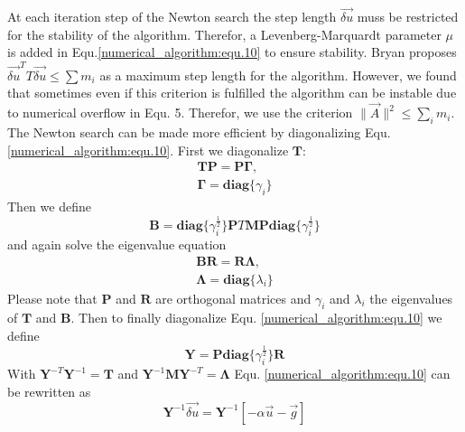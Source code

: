 \documentclass[10pt,letterpaper]{article}
\begin{document}
At each iteration step of the Newton search the step length $\vec{\delta u}$ muss be restricted for the stability of the algorithm.
Therefor, a Levenberg-Marquardt parameter $\mu$ is added in Equ.\ref{numerical_algorithm:equ.10} to ensure stability.
Bryan proposes $\vec{\delta u}^T T \vec{\delta u} \leq \sum m_i$ as a maximum step length for the algorithm.
However, we found that sometimes even if this criterion is fulfilled the algorithm can be instable due to numerical overflow in Equ. 5.
Therefor, we use the criterion $\parallel \vec A \parallel^2 \leq \sum_i m_i$.
The Newton search can be made more efficient by diagonalizing Equ. \ref{numerical_algorithm:equ.10}. First we diagonalize $\mathbf{T}$:
\begin{equation}
	\begin{gathered}
		\mathbf{T} \mathbf{P} = \mathbf{P} \mathbf{\Gamma},\\
		\mathbf{\Gamma} = \mathbf{diag} \{\gamma_i\}
	\end{gathered}
	\label{numerical_algorithm:equ.11}
\end{equation}
Then we define
\begin{equation}
	\mathbf{B} = \mathbf{diag} \{ \gamma_i^{\frac{1}{2}}\}\mathbf{P}T \mathbf{M}\mathbf{P}\mathbf{diag}\{ \gamma_i^{\frac{1}{2}}\}
	\label{numerical_algorithm:equ.12}
\end{equation}
and again solve the eigenvalue equation
\begin{equation}
	\begin{gathered}
		\mathbf{B} \mathbf{R} = \mathbf{R} \mathbf{\Lambda},\\
		\mathbf{\Lambda} = \mathbf{diag} \{\lambda_i\}
	\end{gathered}
	\label{numerical_algorithm:equ.13}
\end{equation}
Please note that $\mathbf{P}$ and $\mathbf{R}$ are orthogonal matrices and $\gamma_i$ and $\lambda_i$ the eigenvalues of $\mathbf{T}$ and $\mathbf{B}$. Then to finally diagonalize Equ. \ref{numerical_algorithm:equ.10} we define 
\begin{equation}
	\mathbf{Y} = \mathbf{P} \mathbf{diag}\{ \gamma_i^{\frac{1}{2}}\} \mathbf{R}
	\label{numerical_algorithm:equ.14}
\end{equation}
With $\mathbf{Y}^{-T}\mathbf{Y}^{-1} = \mathbf{T}$ and $\mathbf{Y}^{-1}\mathbf{M}\mathbf{Y}^{-T} = \mathbf{\Lambda}$ Equ. \ref{numerical_algorithm:equ.10} can be rewritten as
\begin{equation}
	[( \alpha + \mu) \mathbf{I} +\mathbf{\Lambda}]\mathbf{Y}^{-1} \vec{\delta u} = \mathbf{Y}^{-1}[ -\alpha \vec u - \vec g]
	\label{numerical_algorithm:equ.15}
\end{equation}
\end{document}
